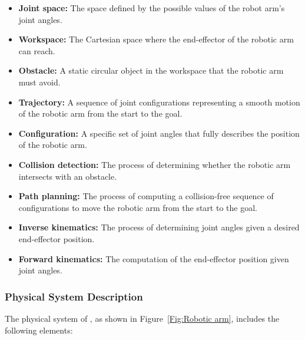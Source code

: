 \documentclass[12pt]{article}
\begin{document}
\begin{itemize}

  \item \textbf{Joint space:} The space defined by the possible values of the robot arm’s joint angles.

  \item \textbf{Workspace:} The Cartesian space where the end-effector of the robotic arm can reach.

  \item \textbf{Obstacle:} A static circular object in the workspace that the robotic arm must avoid.

  \item \textbf{Trajectory:} A sequence of joint configurations representing a smooth motion of the robotic arm from the start to the goal.

  \item \textbf{Configuration:} A specific set of joint angles that fully describes the position of the robotic arm.

  \item \textbf{Collision detection:} The process of determining whether the robotic arm intersects with an obstacle.

  \item \textbf{Path planning:} The process of computing a collision-free sequence of configurations to move the robotic arm from the start to the goal.

  \item \textbf{Inverse kinematics:} The process of determining joint angles given a desired end-effector position.

  \item \textbf{Forward kinematics:} The computation of the end-effector position given joint angles.

  \end{itemize}

\subsubsection{Physical System Description} \label{sec_phySystDescrip}


The physical system of \progname{}, as shown in Figure~\ref{Fig:Robotic arm},
includes the following elements:
\end{document}
